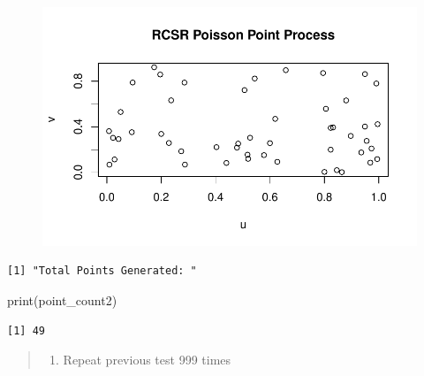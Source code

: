 \documentclass[
  letterpaper,
  DIV=11,
  numbers=noendperiod]{scrartcl}
\newenvironment{Shaded}{\begin{snugshade}}{\end{snugshade}}
\newcommand{\FunctionTok}[1]{\textcolor[rgb]{0.28,0.35,0.67}{#1}}
\newcommand{\NormalTok}[1]{\textcolor[rgb]{0.00,0.23,0.31}{#1}}
\newcommand{\OtherTok}[1]{\textcolor[rgb]{0.00,0.23,0.31}{#1}}
\newcommand{\SpecialCharTok}[1]{\textcolor[rgb]{0.37,0.37,0.37}{#1}}
\newcommand{\StringTok}[1]{\textcolor[rgb]{0.13,0.47,0.30}{#1}}
\providecommand{\tightlist}{%
  \setlength{\itemsep}{0pt}\setlength{\parskip}{0pt}}\usepackage{longtable,booktabs,array}
\begin{document}
\begin{figure}[H]

{\centering \includegraphics{robby_homework1_files/figure-pdf/unnamed-chunk-11-1.pdf}

}

\end{figure}

\begin{Shaded}
\end{Shaded}

\begin{verbatim}
[1] "Total Points Generated: "
\end{verbatim}

\begin{Shaded}
\begin{Highlighting}[]
\FunctionTok{print}\NormalTok{(point\_count2)}
\end{Highlighting}
\end{Shaded}

\begin{verbatim}
[1] 49
\end{verbatim}

\begin{quote}
\begin{enumerate}
\def\labelenumi{\arabic{enumi}.}
\setcounter{enumi}{2}
\tightlist
\item
  Repeat previous test 999 times
\end{enumerate}
\end{quote}
\end{document}

